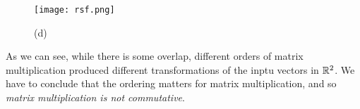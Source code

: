 \documentclass{ximera}
\begin{document}
\begin{example}
\begin{selectAll}
        \end{selectAll}

        \begin{figure}[ht!]
            \centering
            \texttt{[image: rsf.png]}
            \caption{(d)}
        \end{figure}

        \begin{selectAll}


        \end{selectAll}

    As we can see, while there is some overlap, different orders of matrix multiplication produced different transformations of the inptu vectors in $\mathbb{R}^2$. We have to conclude that the ordering matters for matrix multiplication, and so \emph{matrix multiplication is not commutative}.

    \end{example}
\end{document}
